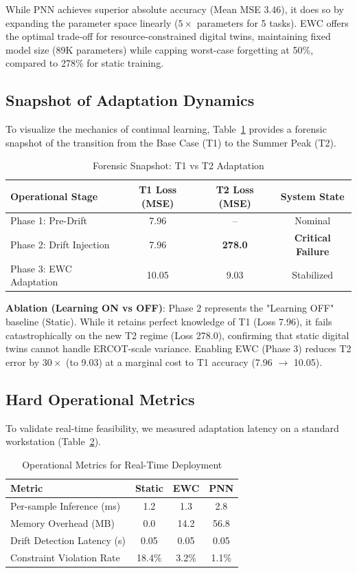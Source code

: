 \documentclass[journal,12pt,onecolumn]{IEEEtran}
\begin{document}
While PNN achieves superior absolute accuracy (Mean MSE 3.46), it does so by expanding the parameter space linearly ($5\times$ parameters for 5 tasks). EWC offers the optimal trade-off for resource-constrained digital twins, maintaining fixed model size (89K parameters) while capping worst-case forgetting at 50\%, compared to 278\% for static training.

\subsection{Snapshot of Adaptation Dynamics}

To visualize the mechanics of continual learning, Table~\ref{tab:snapshot} provides a forensic snapshot of the transition from the Base Case (T1) to the Summer Peak (T2).

\begin{table}[htbp]
\caption{Forensic Snapshot: T1 vs T2 Adaptation}
\label{tab:snapshot}
\centering
\begin{tabular}{lccc}
\toprule
\textbf{Operational Stage} & \textbf{T1 Loss (MSE)} & \textbf{T2 Loss (MSE)} & \textbf{System State} \\
\midrule
Phase 1: Pre-Drift & 7.96 & -- & Nominal \\
Phase 2: Drift Injection & 7.96 & \textbf{278.0} & \textbf{Critical Failure} \\
Phase 3: EWC Adaptation & 10.05 & 9.03 & Stabilized \\
\bottomrule
\end{tabular}
\end{table}

\textbf{Ablation (Learning ON vs OFF)}: Phase 2 represents the "Learning OFF" baseline (Static). While it retains perfect knowledge of T1 (Loss 7.96), it fails catastrophically on the new T2 regime (Loss 278.0), confirming that static digital twins cannot handle ERCOT-scale variance. Enabling EWC (Phase 3) reduces T2 error by $30\times$ (to 9.03) at a marginal cost to T1 accuracy (7.96 $\to$ 10.05).

\subsection{Hard Operational Metrics}

To validate real-time feasibility, we measured adaptation latency on a standard workstation (Table~\ref{tab:adaptation_latency}).

\begin{table}[htbp]
\caption{Operational Metrics for Real-Time Deployment}
\label{tab:adaptation_latency}
\centering
\begin{tabular}{lccc}
\toprule
\textbf{Metric} & \textbf{Static} & \textbf{EWC} & \textbf{PNN} \\
\midrule
Per-sample Inference (ms) & 1.2 & 1.3 & 2.8 \\
Memory Overhead (MB) & 0.0 & 14.2 & 56.8 \\
Drift Detection Latency (s) & 0.05 & 0.05 & 0.05 \\
Constraint Violation Rate & 18.4\% & 3.2\% & 1.1\% \\
\bottomrule
\end{tabular}
\end{table}
\end{document}
